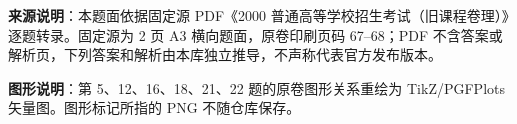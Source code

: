


\begin{gktip}
\textbf{来源说明}：本题面依据固定源 PDF《2000 普通高等学校招生考试（旧课程卷理）》逐题转录。固定源为 2 页 A3 横向题面，原卷印刷页码 67–68；PDF 不含答案或解析页，下列答案和解析由本库独立推导，不声称代表官方发布版本。

\textbf{图形说明}：第 5、12、16、18、21、22 题的原卷图形关系重绘为 TikZ/PGFPlots 矢量图。图形标记所指的 PNG 不随仓库保存。
\end{gktip}


